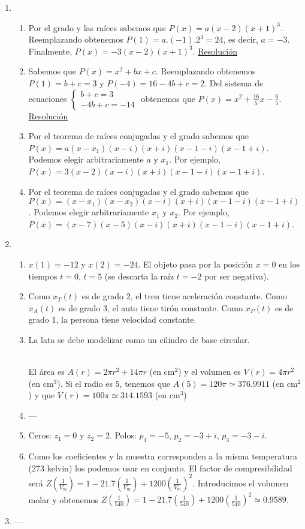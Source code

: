 \documentclass[a4paper]{article}
\newcommand{\exercise}{\item}
\newcommand{\SEL}[1]{\left\{\begin{matrix} #1 \end{matrix}\right.}
\newcommand{\df}[2]{\displaystyle\frac{#1}{#2}}
\newcommand{\img}[2]{ \begin{minipage}[t]{\linewidth} \raisebox{-\height}{\texttt{[image: \#2]}} \end{minipage} }
\begin{document}
\begin{enumerate}
\begin{enumerate} [label=(\alph*)]
		\item Es equivalente a $x^5-3x-8=0$. Por el teorema de la raíz real para polinomios de grado impar sabemos que debe tener una raíz real. La aproximamos por Bolzano: $x_1 \simeq 1.6706$. 
\end{enumerate}\exercise\begin{enumerate} [label=(\alph*)]		\item Por el grado y las raíces sabemos que $P(x)=a(x-2)(x+1)^3$. Reemplazando obtenemos $P(1)=a.(-1).2^3=24$, es decir, $a=-3$. Finalmente, $P(x)=-3(x-2)(x+1)^3$. \href{https://youtu.be/_XVYatmUKBg}{Resolución}
		\item Sabemos que $P(x)=x^2+bx+c$. Reemplazando obtenemos $P(1)=b+c=3$ y $P(-4)=16-4b+c=2$. Del sistema de ecuaciones $\SEL{b+c=3 \\ -4b+c=-14}$ obtenemos que $P(x)=x^2+\df{16}{5}x-\df{6}{5}$. \href{https://youtu.be/LDpq_f-baPc}{Resolución}
		\item Por el teorema de raíces conjugadas y el grado sabemos que $P(x)=a(x-x_1)(x-i)(x+i)(x-1-i)(x-1+i)$. Podemos elegir arbitrariamente $a$ y $x_1$. Por ejemplo, $P(x)=3(x-2)(x-i)(x+i)(x-1-i)(x-1+i)$.
		\item Por el teorema de raíces conjugadas y el grado sabemos que $P(x)=(x-x_1)(x-x_2)(x-i)(x+i)(x-1-i)(x-1+i)$. Podemos elegir arbitrariamente $x_1$ y $x_2$. Por ejemplo, $P(x)=(x-7)(x-5)(x-i)(x+i)(x-1-i)(x-1+i)$.
\end{enumerate}\exercise\begin{enumerate} [label=(\alph*)]		\item $x(1)=-12$ y $x(2)=-24$. El objeto pasa por la posición $x=0$ en los tiempos $t=0$, $t=5$ (se descarta la raíz $t=-2$ por ser negativa). 
		\item Como $x_T(t)$ es de grado 2, el tren tiene aceleración constante. Como $x_A(t)$ es de grado 3, el auto tiene tirón constante. Como $x_P(t)$ es de grado 1, la persona tiene velocidad constante.
		\item La lata se debe modelizar como un cilindro de base circular. \\ \img{0.4\textwidth}{./img/lata.png} \\ El área es $A(r)=2 \pi r^2+ 14 \pi r$ (en cm$^2$) y el volumen es $V(r)=4 \pi r^2$ (en cm$^3$). Si el radio es $5$, tenemos que $A(5)=120\pi \simeq 376.9911$ (en cm$^2$) y que $V(r)=100\pi \simeq 314.1593$ (en cm$^3$)
\item ---		\item Ceros: $z_1=0$ y $z_2=2$. Polos: $p_1=-5$, $p_2=-3+i$, $p_3=-3-i$.
		\item Como los coeficientes y la muestra corresponden a la misma temperatura (273 kelvin) los podemos usar en conjunto. El factor de compresibilidad será $Z\left(\frac{1}{V_m}\right)=1-21.7\left(\frac{1}{V_m}\right)+1200\left(\frac{1}{V_m}\right)^2$. Introducimos el volumen molar y obtenemos $Z\left(\frac{1}{540}\right)=1-21.7\left(\frac{1}{540}\right)+1200\left(\frac{1}{540}\right)^2 \simeq 0.9589$.
\end{enumerate}\exercise---\end{enumerate}
\end{document}
